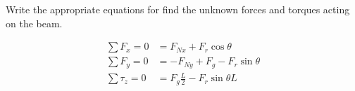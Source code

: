 Write the appropriate equations for find the unknown forces and torques acting on the beam.

\begin{solution}
\begin{align*}
    \sum F_x = 0 &= F_{Nx} + F_r\cos{\theta} \\
    \sum F_y = 0 &= -F_{Ny} + F_g - F_r\sin{\theta} \\
    \sum \tau_z = 0 &= F_g\frac{L}{2} - F_r\sin{\theta}L
\end{align*}
\end{solution}